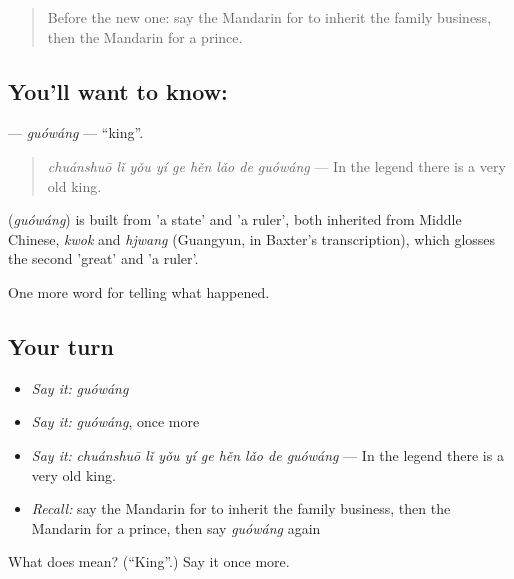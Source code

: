 \begin{quote}
Before the new one: say the Mandarin for to inherit the family business, then the Mandarin for a prince.
\end{quote}

\subsection*{You'll want to know: }
\textbf{} — \emph{guówáng} — \textquotedblleft{}king\textquotedblright{}.

\begin{quote}
\textbf{} \emph{chuánshuō lǐ yǒu yí ge hěn lǎo de guówáng} — In the legend there is a very old king.
\end{quote}

\begin{cousinweb}
\textbf{} (\emph{guówáng}) is built from  'a state' and  'a ruler', both inherited from Middle Chinese, \emph{kwok} and \emph{hjwang} (Guangyun, in Baxter's transcription), which glosses the second 'great' and 'a ruler'.
\end{cousinweb}

\begin{grammarlens}[title={What you've built}]
One more word for telling what happened.
\end{grammarlens}

\subsection*{Your turn}
\begin{itemize}
\raggedright
  \item \emph{Say it:} \emph{guówáng}
  \item \emph{Say it:} \emph{guówáng}, once more
  \item \emph{Say it:} \emph{chuánshuō lǐ yǒu yí ge hěn lǎo de guówáng} — In the legend there is a very old king.
  \item \emph{Recall:} say the Mandarin for to inherit the family business, then the Mandarin for a prince, then say \emph{guówáng} again
\end{itemize}

\begin{tcolorbox}[breakable,colback=teal!4,colframe=teal!35!black,title={Before you move on}]
What does  mean? (\textquotedblleft{}King\textquotedblright{}.) Say it once more.
\end{tcolorbox}
